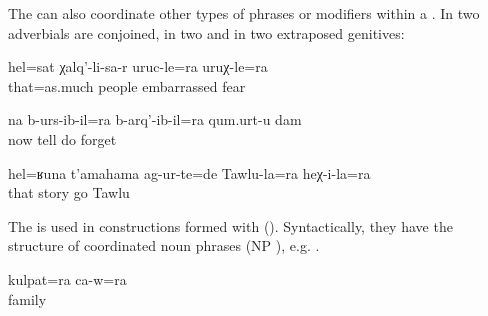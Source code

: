 The  can also coordinate other types of phrases or modifiers within a . In  two adverbials are conjoined, in  two  and in  two extraposed genitives:
%
\begin{exe}
	\ex	\label{ex:‎‎‎as much as being embarrassed and anxious in front of people}
	\gll	hel=sat	χalq'-li-sa-r	uruc-le=ra		uruχ-le=ra\\
		that=as.much	people	embarrassed\tsc{-advz=add}	fear\\
	\glt	{}

	\ex	\label{ex:‎Now I forget what I say and what I do}
	\gll	na	b-urs-ib-il=ra	b-arq'-ib-il=ra	qum.urt-u	dam\\
		now	tell do	forget	\\
	\glt	{}

	\ex	\label{ex:‎Such a story happened to Tawlu and him}
	\gll	hel=ʁuna	t'amahama	ag-ur-te=de	Tawlu-la=ra	heχ-i-la=ra\\
		that	story	go	Tawlu	\\
	\glt	{}
\end{exe}

The  is used in  constructions formed with  (). Syntactically, they have the structure of coordinated noun phrases (NP ), e.g. .
%
\begin{exe}
	\ex	\label{ex:with his family}
	\gll	kulpat=ra ca-w=ra\\
		family	\\
	\glt	{}
\end{exe}

